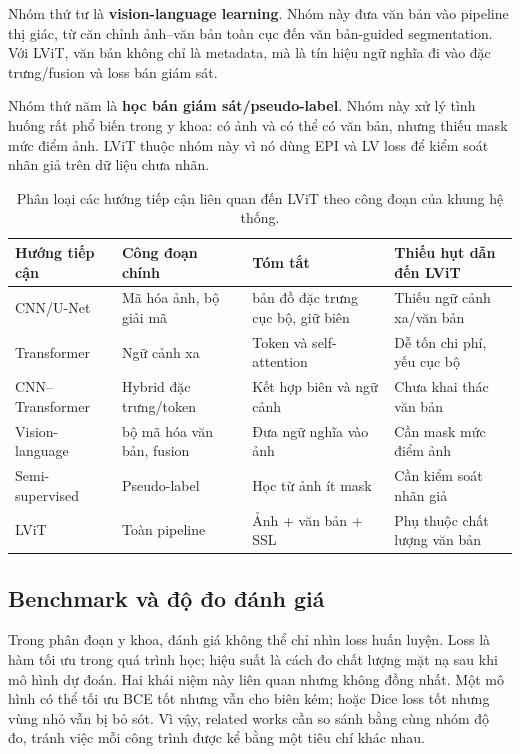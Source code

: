 Nhóm thứ tư là \textbf{vision-language learning}. Nhóm này đưa văn bản vào pipeline thị giác, từ căn chỉnh ảnh--văn bản toàn cục đến văn bản-guided segmentation. Với LViT, văn bản không chỉ là metadata, mà là tín hiệu ngữ nghĩa đi vào đặc trưng/fusion và loss bán giám sát.

Nhóm thứ năm là \textbf{học bán giám sát/pseudo-label}. Nhóm này xử lý tình huống rất phổ biến trong y khoa: có ảnh và có thể có văn bản, nhưng thiếu mask mức điểm ảnh. LViT thuộc nhóm này vì nó dùng EPI và LV loss để kiểm soát nhãn giả trên dữ liệu chưa nhãn.

\begin{table}[!t]
  \centering
  \caption{Phân loại các hướng tiếp cận liên quan đến LViT theo công đoạn của khung hệ thống.}
  \label{tab:approach-taxonomy}
  \scriptsize
  \renewcommand{\arraystretch}{1.15}
  \setlength{\tabcolsep}{5pt}
  \begin{tabularx}{\textwidth}{@{}l L L L@{}}
    \toprule
    Hướng tiếp cận & Công đoạn chính & Tóm tắt & Thiếu hụt dẫn đến LViT \\
    \midrule
    CNN/U-Net & Mã hóa ảnh, bộ giải mã & bản đồ đặc trưng cục bộ, giữ biên & Thiếu ngữ cảnh xa/văn bản \\
    Transformer & Ngữ cảnh xa & Token và self-attention & Dễ tốn chi phí, yếu cục bộ \\
    CNN--Transformer & Hybrid đặc trưng/token & Kết hợp biên và ngữ cảnh & Chưa khai thác văn bản \\
    Vision-language & bộ mã hóa văn bản, fusion & Đưa ngữ nghĩa vào ảnh & Cần mask mức điểm ảnh \\
    Semi-supervised & Pseudo-label & Học từ ảnh ít mask & Cần kiểm soát nhãn giả \\
    LViT & Toàn pipeline & Ảnh + văn bản + SSL & Phụ thuộc chất lượng văn bản \\
    \bottomrule
  \end{tabularx}
\end{table}
\FloatBarrier

\subsection{Benchmark và độ đo đánh giá}

Trong phân đoạn y khoa, đánh giá không thể chỉ nhìn loss huấn luyện. Loss là hàm tối ưu trong quá trình học; hiệu suất là cách đo chất lượng mặt nạ sau khi mô hình dự đoán. Hai khái niệm này liên quan nhưng không đồng nhất. Một mô hình có thể tối ưu BCE tốt nhưng vẫn cho biên kém; hoặc Dice loss tốt nhưng vùng nhỏ vẫn bị bỏ sót. Vì vậy, related works cần so sánh bằng cùng nhóm độ đo, tránh việc mỗi công trình được kể bằng một tiêu chí khác nhau.

